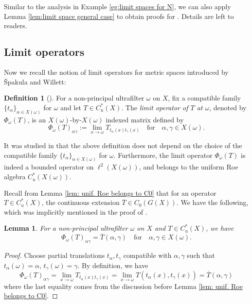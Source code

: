 \documentclass[12pt, a4paper]{amsart}
\numberwithin{equation}{section}
\newtheorem{lem}[thm]{Lemma}
\theoremstyle{definition}
\newtheorem{defn}[thm]{Definition}
\theoremstyle{remark}
\begin{document}
Similar to the analysis in Example \ref{eg:limit spaces for N}, we can also apply Lemma \ref{lem:limit space general case} to obtain proofs for \cite[Example 3.14(3)-(5)]{SW17}. Details are left to readers.


\subsection{Limit operators}

Now we recall the notion of limit operators for metric spaces introduced by \v{S}pakula and Willett:

\begin{defn}[{\cite[Definition 4.4]{SW17}}]\label{defn:limit operator}
For a non-principal ultrafilter $\omega$ on $X$, fix a compatible family $\{t_\alpha\}_{\alpha \in X(\omega)}$ for $\omega$ and let $T \in C^*_u(X)$. The \emph{limit operator of $T$ at $\omega$}, denoted by $\Phi_\omega(T)$, is an $X(\omega)$-by-$X(\omega)$ indexed matrix defined by
\[
\Phi_\omega(T)_{\alpha\gamma}:=\lim_{x \to \omega}T_{t_{\alpha}(x)t_{\gamma}(x)} \quad \text{for} \quad \alpha, \gamma \in X(\omega).
\]
\end{defn}

It was studied in \cite[Chapter 4]{SW17} that the above definition does not depend on the choice of the compatible family $\{t_\alpha\}_{\alpha \in X(\omega)}$ for $\omega$. Furthermore, the limit operator $\Phi_\omega(T)$ is indeed a bounded operator on $\ell^2(X(\omega))$, and belongs to the uniform Roe algebra $C^*_u(X(\omega))$.


Recall from Lemma \ref{lem: unif. Roe belongs to C0} that for an operator $T \in C^*_u(X)$, the continuous extension $\overline{T} \in C_0(G(X))$. We have the following, which was implicitly mentioned in the proof of \cite[Lemma C.3]{SW17}.

\begin{lem}\label{lem:limit operator using extension}
For a non-principal ultrafilter $\omega$ on $X$ and $T \in C^*_u(X)$, we have 
\[
\Phi_\omega(T)_{\alpha\gamma} = \overline{T}(\alpha, \gamma) \quad \text{for} \quad \alpha, \gamma \in X(\omega).
\]
\end{lem}

\begin{proof}
Choose partial translations $t_\alpha, t_\gamma$ compatible with $\alpha, \gamma$ such that $t_\alpha(\omega) = \alpha$, $t_\gamma(\omega) = \gamma$. By definition, we have
\[
\Phi_\omega(T)_{\alpha\gamma} = \lim_{x \to \omega}T_{t_{\alpha}(x)t_{\gamma}(x)} = \lim_{x \to \omega}T(t_{\alpha}(x),t_{\gamma}(x)) = \overline{T}(\alpha, \gamma)
\]
where the last equality comes from the discussion before Lemma \ref{lem: unif. Roe belongs to C0}.
\end{proof}
\end{document}
